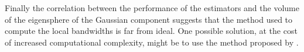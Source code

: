 Finally the correlation between the performance of the estimators and the volume of the eigensphere of the Gaussian component suggests that the method used to compute the local bandwidths is far from ideal. 
One possible solution, at the cost of increased computational complexity, might be to use the method proposed by \citeauthor{breiman1977variable}.